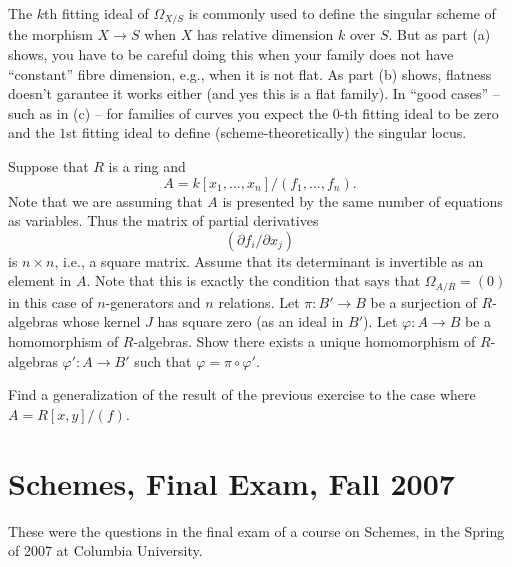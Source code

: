 \begin{remark}
\label{exercise-fitting-omega-not-sings}
The $k$th fitting ideal of $\Omega_{X/S}$ is commonly used
to define the singular scheme of the morphism $X \to S$ when $X$ has relative
dimension $k$ over $S$. But as part (a) shows, you have to be careful doing
this when your family does not have ``constant'' fibre dimension, e.g., when
it is not flat. As part (b) shows, flatness doesn't garantee it works either
(and yes this is a flat family). In ``good cases'' -- such as in (c) -- for
families of curves you expect the $0$-th fitting ideal to be zero and
the $1$st fitting ideal to define (scheme-theoretically) the singular locus.
\end{remark}

\begin{exercise}
\label{exercise-formally-smooth}
Suppose that $R$ is a ring and
$$
A = k[x_1, \ldots, x_n]/(f_1, \ldots, f_n).
$$
Note that we are assuming that $A$ is presented by the same
number of equations as variables. Thus the matrix of partial
derivatives
$$
( \partial f_i / \partial x_j )
$$
is $n\times n$, i.e., a square matrix. Assume that
its determinant is invertible as an element in $A$. Note that
this is exactly the condition that says that $\Omega_{A/R} = (0)$
in this case of $n$-generators and $n$ relations.
Let $\pi : B' \to B$ be a surjection of $R$-algebras
whose kernel $J$ has square zero (as an ideal in $B'$).
Let $\varphi : A \to B$ be a homomorphism of $R$-algebras.
Show there exists a unique homomorphism of $R$-algebras
$\varphi' : A \to B'$ such that $\varphi = \pi \circ \varphi'$.
\end{exercise}

\begin{exercise}
\label{exercise-formally-smooth-one-equation}
Find a generalization
of the result of the previous exercise to the case where $A = R[x, y]/(f)$.
\end{exercise}



\section{Schemes, Final Exam, Fall 2007}
\label{section-final-exam-fall-2007}

\noindent
These were the questions in the final exam of a course on Schemes,
in the Spring of 2007 at Columbia University.

